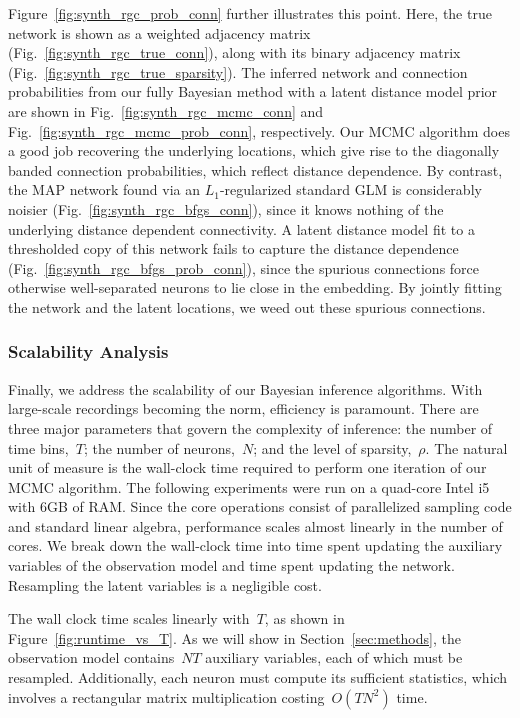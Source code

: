 Figure~\ref{fig:synth_rgc_prob_conn} further illustrates this
point. Here, the true network is shown as a weighted adjacency matrix
(Fig.~\ref{fig:synth_rgc_true_conn}), along with its binary adjacency
matrix (Fig.~\ref{fig:synth_rgc_true_sparsity}). The inferred network
and connection probabilities from our fully Bayesian method with a
latent distance model prior are shown in
Fig.~\ref{fig:synth_rgc_mcmc_conn} and
Fig.~\ref{fig:synth_rgc_mcmc_prob_conn}, respectively. Our MCMC
algorithm does a good job recovering the underlying locations, which
give rise to the diagonally banded connection probabilities, which reflect 
distance dependence.  By
contrast, the MAP network found via an $L_1$-regularized standard GLM
is considerably noisier (Fig.~\ref{fig:synth_rgc_bfgs_conn}), since it
knows nothing of the underlying distance dependent connectivity. A
latent distance model fit to a thresholded copy of this network fails
to capture the distance dependence
(Fig.~\ref{fig:synth_rgc_bfgs_prob_conn}), since the spurious
connections force otherwise well-separated neurons to lie close in the
embedding. By jointly fitting the network and the latent locations, we
weed out these spurious connections.

\subsubsection{Scalability Analysis}

Finally, we address the scalability of our Bayesian inference algorithms.
With large-scale recordings becoming the norm, efficiency is paramount.
There are three major parameters that govern the complexity of inference:
the number of time bins,~$T$; the number of neurons,~$N$; and the level
of sparsity,~$\rho$. The natural unit of measure is the wall-clock time
required to perform one iteration of our MCMC algorithm. The following
experiments were run on a quad-core Intel i5 with 6GB of RAM. Since the
core operations consist of parallelized sampling code and standard linear
algebra, performance scales almost linearly in the number of cores. We
break down the wall-clock time into time spent updating the auxiliary
variables of the observation model and time spent updating the network.
Resampling the latent variables is a negligible cost.

The wall clock time scales linearly with~$T$, as shown in
Figure~\ref{fig:runtime_vs_T}. As we will show in
Section~\ref{sec:methods}, the observation model contains~${NT}$
auxiliary variables, each of which must be resampled. Additionally,
each neuron must compute its sufficient statistics, which involves a
rectangular matrix multiplication costing~$O(TN^2)$ time.

